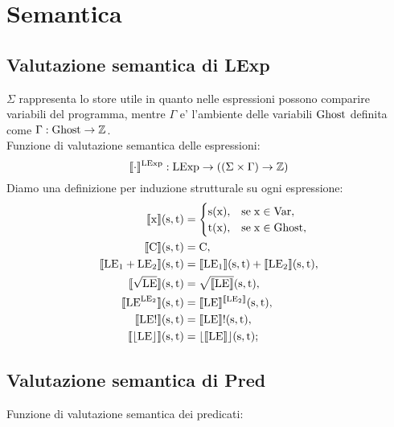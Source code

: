 \documentclass[a4paper, 12pt, oneside,fleqn]{book}
\begin{document}
\chapter{Semantica}
\section{Valutazione semantica di LExp}
$\Sigma$ rappresenta lo store utile in quanto nelle espressioni possono comparire variabili del programma, mentre $\Gamma$ e' l'ambiente delle variabili $\mathrm{Ghost}$ definita come $\Gamma\mathrel{:}\mathrm{Ghost}\rightarrow\mathbb{Z}$.\\
Funzione di valutazione semantica delle espressioni:
$$\llbracket\cdot\rrbracket ^{\mathrm{LExp}}: \mathrm{LExp} \rightarrow ((\Sigma \times \Gamma) \rightarrow \mathbb{Z})$$
Diamo una definizione per induzione strutturale su ogni espressione:
\begin{align}
\llbracket \mathrm{x}\rrbracket(\mathrm{s},\mathrm{t}) &= 
	\begin{cases}
		\mathrm{s}(\mathrm{x}), &\text{se}\hspace{1mm} \mathrm{x}\in\mathrm{Var},  \\  \mathrm{t}(\mathrm{x}), &\text{se}\hspace{1mm} \mathrm{x}\in\mathrm{Ghost},
	\end{cases}\\
\llbracket \mathrm{C}\rrbracket(\mathrm{s},\mathrm{t}) &= \mathrm{C},\\
\llbracket \mathrm{LE}{_1}+\mathrm{LE}{_2} \rrbracket(\mathrm{s},\mathrm{t}) &= \llbracket \mathrm{LE}{_1} \rrbracket(\mathrm{s},\mathrm{t}) + \llbracket \mathrm{LE}{_2}\rrbracket(\mathrm{s},\mathrm{t}),\\
\llbracket \sqrt{\mathrm{LE}} \rrbracket(\mathrm{s},\mathrm{t}) &= \sqrt{\llbracket\mathrm{LE}\rrbracket}(\mathrm{s},\mathrm{t}),\\
\llbracket \mathrm{LE}^{\mathrm{LE}{_2}}\rrbracket(\mathrm{s},\mathrm{t}) &= \llbracket\mathrm{LE}\rrbracket^{\llbracket\mathrm{LE}{_2}\rrbracket}(\mathrm{s},\mathrm{t}),\\
\llbracket \mathrm{LE}!\rrbracket(\mathrm{s},\mathrm{t}) &= \llbracket\mathrm{LE}\rrbracket!(\mathrm{s},\mathrm{t}),\\
\llbracket \lfloor \mathrm{LE} \rfloor\rrbracket(\mathrm{s},\mathrm{t}) &= \lfloor\llbracket \mathrm{LE} \rrbracket\rfloor(\mathrm{s},\mathrm{t});
\end{align}
\section{Valutazione semantica di Pred}
Funzione di valutazione semantica dei predicati:
\end{document}
